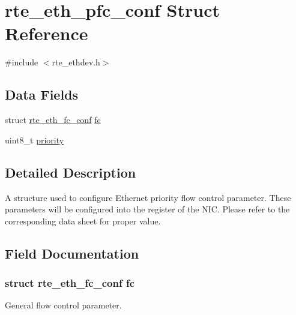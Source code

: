 \hypertarget{structrte__eth__pfc__conf}{}\section{rte\+\_\+eth\+\_\+pfc\+\_\+conf Struct Reference}
\label{structrte__eth__pfc__conf}


{\ttfamily \#include $<$rte\+\_\+ethdev.\+h$>$}

\subsection*{Data Fields}
\begin{DoxyCompactItemize}
\item 
struct \hyperlink{structrte__eth__fc__conf}{rte\+\_\+eth\+\_\+fc\+\_\+conf} \hyperlink{structrte__eth__pfc__conf_afee96056dc851dc11e00af35c0259cee}{fc}
\item 
uint8\+\_\+t \hyperlink{structrte__eth__pfc__conf_a0ad043071ccc7a261d79a759dc9c6f0c}{priority}
\end{DoxyCompactItemize}


\subsection{Detailed Description}
A structure used to configure Ethernet priority flow control parameter. These parameters will be configured into the register of the N\+I\+C. Please refer to the corresponding data sheet for proper value. 

\subsection{Field Documentation}
\hypertarget{structrte__eth__pfc__conf_afee96056dc851dc11e00af35c0259cee}{}
\subsubsection[{fc}]{\setlength{\rightskip}{0pt plus 5cm}struct {\bf rte\+\_\+eth\+\_\+fc\+\_\+conf} fc}\label{structrte__eth__pfc__conf_afee96056dc851dc11e00af35c0259cee}
General flow control parameter. \hypertarget{structrte__eth__pfc__conf_a0ad043071ccc7a261d79a759dc9c6f0c}{}

